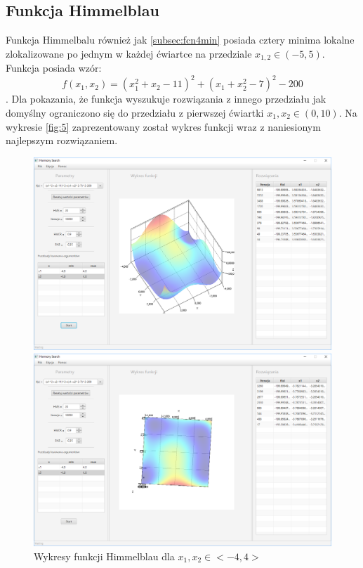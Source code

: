 \documentclass[10pt, a4paper]{article}
\begin{document}
\subsection{Funkcja Himmelblau}
\label{subsec:himmelblau}
Funkcja Himmelbalu również jak \ref{subsec:fcn4min} posiada cztery minima lokalne zlokalizowane po jednym w każdej ćwiartce na przedziale $x_{1,2} \in (-5,5)$. Funkcja posiada wzór: $$ f(x_{1},x_{2}) = (x_{1}^{2}+x_{2}-11)^{2}+(x_{1}+x_{2}^{2}-7)^{2}-200$$. Dla pokazania, że funkcja wyszukuje rozwiązania z innego przedziału jak domyślny ograniczono się do przedziału z pierwszej ćwiartki $x_{1}, x_{2} \in (0,10)$. Na wykresie \ref{fig:5} zaprezentowany został wykres funkcji wraz z naniesionym najlepszym rozwiązaniem. 
\begin{figure}[htbp] 
	\begin{minipage}[b]{.5\textwidth}
		\centering
		\includegraphics[width=\linewidth]{images/31.PNG} 
	\end{minipage} 
	\begin{minipage}[b]{.5\textwidth}
		\centering
		\includegraphics[width=\linewidth]{images/32.PNG} 
	\end{minipage}
	\label{fig:31}
	\caption{Wykresy funkcji Himmelblau dla $x_{1}, x_{2} \in <-4,4>$}
\end{figure}
\end{document}
